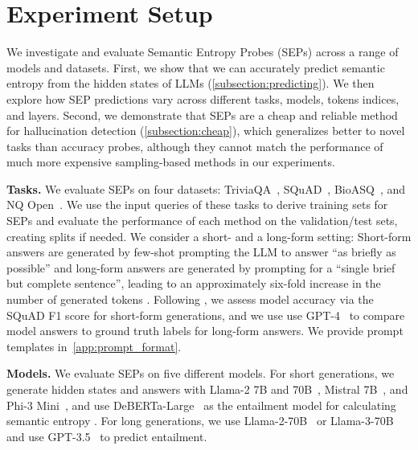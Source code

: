 \documentclass{article}
\begin{document}
\section{Experiment Setup}
\label{sec:experiments}

We investigate and evaluate Semantic Entropy Probes (SEPs) across a range of models and datasets. 
First, we show that we can accurately predict semantic entropy from the hidden states of LLMs (\cref{subsection:predicting}).
We then explore how SEP predictions vary across different tasks, models, tokens indices, and layers. 
Second, we demonstrate that SEPs are a cheap and reliable method for hallucination detection (\cref{subsection:cheap}), which generalizes better to novel tasks than accuracy probes, although they cannot match the performance of much more expensive sampling-based methods in our experiments.

\textbf{Tasks.} We evaluate SEPs on four datasets: TriviaQA~\citep{Joshi2017-zj}, SQuAD~\citep{rajpurkar2018know}, BioASQ~\citep{Tsatsaronis2015-en}, and NQ Open~\citep{kwiatkoski2019natural}. 
We use the input queries of these tasks to derive training sets for SEPs and evaluate the performance of each method on the validation/test sets, creating splits if needed.
We consider a short- and a long-form setting: Short-form answers are generated by few-shot prompting the LLM to answer ``as briefly as possible'' and long-form answers are generated by prompting for a ``single brief but complete sentence'', leading to an approximately six-fold increase in the number of generated tokens \citep{farquhar2024detecting}.
Following \citet{farquhar2024detecting}, we assess model accuracy via the SQuAD F1 score for short-form generations, and we use use GPT-4~\citep{openai2023gpt4} to compare model answers to ground truth labels for long-form answers.
We provide prompt templates in~\cref{app:prompt_format}.

\textbf{Models.} We evaluate SEPs on five different models. For short generations, we generate hidden states and answers with Llama-2 7B and 70B~\cite{touvron2023llama2}, Mistral 7B~\citep{jiang2023mistral}, and Phi-3 Mini~\citep{abdin2024phi3}, and use DeBERTa-Large~\citep{he2021deberta} as the entailment model for calculating semantic entropy \citep{kuhn2023semantic}. For long generations, we use Llama-2-70B~\citep{touvron2023llama2} or Llama-3-70B~\citep{llama3_2024} and use GPT-3.5~\citep{brown2020language} to predict entailment.
\end{document}
